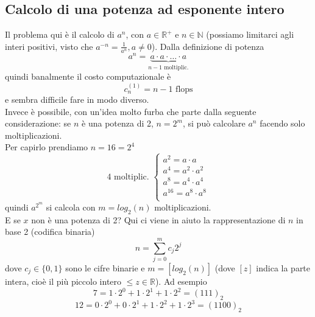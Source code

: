 \subsection{Calcolo di una potenza ad esponente intero}
Il problema qui è il calcolo di $a^n$, con $a\in\mathbb{R}^+$ e $n\in \mathbb{N}$ (possiamo limitarci agli interi positivi, visto che $a^{-n}=\frac{1}{a^n}, a\neq0$). Dalla definizione di potenza
\[a^n = \underbrace{a\cdot a\cdot \dotsc \cdot a }_{n-1 \text{ moltiplic.}} \]
quindi banalmente il costo computazionale è
\[ c_n^{(1)}=n-1 \text{ flops}\]
e sembra difficile fare in modo diverso.\\
Invece è possibile, con un'idea molto furba che parte dalla seguente considerazione: se $n$ è una potenza di 2, $n=2^m$, si può calcolare $a^n$ facendo solo moltiplicazioni.\\
Per capirlo prendiamo $n=16=2^4$
\[ 4 \text{ moltiplic. }
\begin{cases}
    a^2 = a \cdot a \\
    a^4 = a^2 \cdot a^2 \\
    a^8 = a^4 \cdot a^4 \\
    a^{16} = a^8 \cdot a^8 \\
\end{cases}\]
quindi $a^{2^m}$ si calcola con $m=log_2(n)$ moltiplicazioni.\\
E se $x$ non è una potenza di 2? Qui ci viene in aiuto la rappresentazione di $n$ in base 2 (codifica binaria)
\[n=\sum_{j=0}^m c_j2^j\]
dove $c_j\in{\{0,1\}}$ sono le cifre binarie e $m=[log_2(n)]$ (dove $[z]$ indica la parte intera, cioè il più piccolo intero $\le z\in\mathbb{R}$). Ad esempio
\[7 = 1\cdot 2^0+1\cdot 2^1+1\cdot 2^2=(111)_2\]
\[12=0\cdot 2^0+0\cdot 2^1+1\cdot 2^2+1\cdot 2^3=(1100)_2\]

